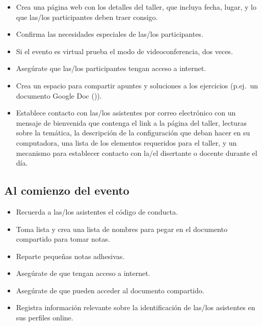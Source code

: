 \begin{itemize}

\item
  Crea una página web con los detalles del taller,
  que incluya fecha,
  lugar,
  y lo que las/los participantes deben traer consigo.

\item
  Confirma las necesidades especiales de las/los participantes.

\item
  Si el evento es virtual prueba el modo de videoconferencia, dos veces.

\item
  Asegúrate que las/los participantes tengan acceso a internet.

\item
  Crea un espacio para compartir apuntes y soluciones a los ejercicios (p.ej.\ un documento Google Doc ()).

\item
  Establece contacto con las/los asistentes por correo electrónico con un mensaje de bienvenida que contenga
  el link a la página del taller,
  lecturas sobre la temática,
  la descripción de la configuración que deban hacer en su computadora,
  una lista de los elementos requeridos para el taller,
  y un mecanismo para establecer contacto con la/el disertante o docente durante el día.

\end{itemize}

\subsection*{Al comienzo del evento}

\begin{itemize}

\item
  Recuerda a las/los asistentes el código de conducta.

\item
  Toma lista
  y crea una lista de nombres para pegar en el documento compartido para tomar notas.

\item
  Reparte pequeñas notas adhesivas.

\item
  Asegúrate de que tengan acceso a internet.
  
\item
  Asegúrate de que pueden acceder al documento compartido.

\item
  Registra información relevante sobre la identificación de las/los asistentes en sus perfiles online.

\end{itemize}

